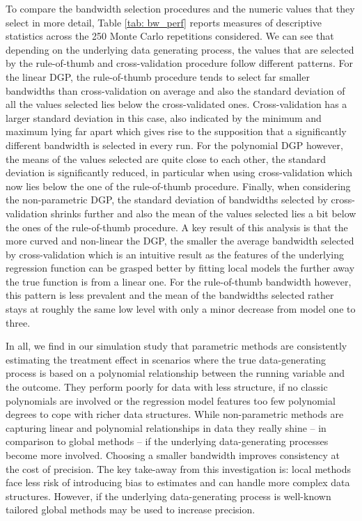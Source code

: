 \documentclass[11pt, a4paper, leqno]{article}
\numberwithin{equation}{section}
\numberwithin{figure}{section}
\numberwithin{table}{section}
\numberwithin{algorithm}{section}
\begin{document}
To compare the bandwidth selection procedures and the numeric values that they select in more detail, Table \ref{tab: bw_perf} reports measures of descriptive statistics across the 250 Monte Carlo repetitions considered. We can see that depending on the underlying data generating process, the values that are selected by the rule-of-thumb and cross-validation procedure follow different patterns. For the linear DGP, the rule-of-thumb procedure tends to select far smaller bandwidths than cross-validation on average and also the standard deviation of all the values selected lies below the cross-validated ones. Cross-validation has a larger standard deviation in this case, also indicated by the minimum and maximum lying far apart which gives rise to the supposition that a significantly different bandwidth is selected in every run. For the polynomial DGP however, the means of the values selected are quite close to each other, the standard deviation is significantly reduced, in particular when using cross-validation which now lies below the one of the rule-of-thumb procedure. Finally, when considering the non-parametric DGP, the standard deviation of bandwidths selected by cross-validation shrinks further and also the mean of the values selected lies a bit below the ones of the rule-of-thumb procedure. A key result of this analysis is that the more curved and non-linear the DGP, the smaller the average bandwidth selected by cross-validation which is an intuitive result as the features of the underlying regression function can be grasped better by fitting local models the further away the true function is from a linear one. For the rule-of-thumb bandwidth however, this pattern is less prevalent and the mean of the bandwidths selected rather stays at roughly the same low level with only a minor decrease from model one to three.


In all, we find in our simulation study that parametric methods are consistently estimating the treatment effect in scenarios where the true data-generating process is based on a polynomial relationship between the running variable and the outcome. They perform poorly for data with less structure, if no classic polynomials are involved or the regression model features too few polynomial degrees to cope with richer data structures. While non-parametric methods are capturing linear and polynomial relationships in data they really shine -- in comparison to global methods -- if the underlying data-generating processes become more involved. Choosing a smaller bandwidth improves consistency at the cost of precision. The key take-away from this investigation is: local methods face less risk of introducing bias to estimates and can handle more complex data structures. However, if the underlying data-generating process is well-known tailored global methods may be used to increase precision.
\end{document}

